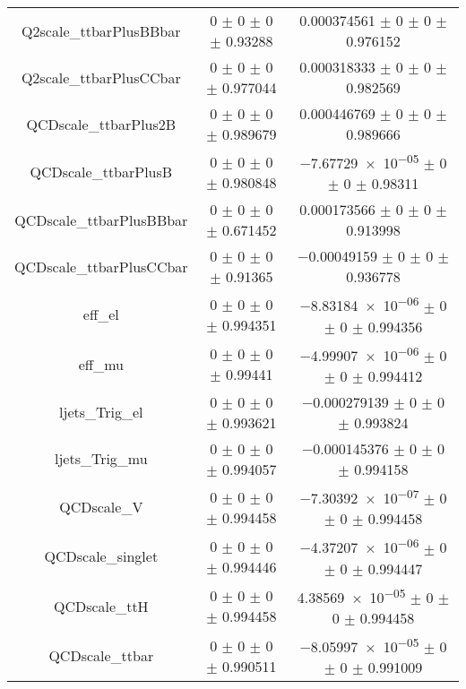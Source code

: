 \begin{table}
\begin{tabular}{ccc}
Q2scale\_ttbarPlusBBbar & \num{0} $\pm$ \num{0} $\pm$ \num{0} $\pm$ \num{0.93288} & \num{0.000374561} $\pm$ \num{0} $\pm$ \num{0} $\pm$ \num{0.976152}\\
Q2scale\_ttbarPlusCCbar & \num{0} $\pm$ \num{0} $\pm$ \num{0} $\pm$ \num{0.977044} & \num{0.000318333} $\pm$ \num{0} $\pm$ \num{0} $\pm$ \num{0.982569}\\
QCDscale\_ttbarPlus2B & \num{0} $\pm$ \num{0} $\pm$ \num{0} $\pm$ \num{0.989679} & \num{0.000446769} $\pm$ \num{0} $\pm$ \num{0} $\pm$ \num{0.989666}\\
QCDscale\_ttbarPlusB & \num{0} $\pm$ \num{0} $\pm$ \num{0} $\pm$ \num{0.980848} & \num{-7.67729e-05} $\pm$ \num{0} $\pm$ \num{0} $\pm$ \num{0.98311}\\
QCDscale\_ttbarPlusBBbar & \num{0} $\pm$ \num{0} $\pm$ \num{0} $\pm$ \num{0.671452} & \num{0.000173566} $\pm$ \num{0} $\pm$ \num{0} $\pm$ \num{0.913998}\\
QCDscale\_ttbarPlusCCbar & \num{0} $\pm$ \num{0} $\pm$ \num{0} $\pm$ \num{0.91365} & \num{-0.00049159} $\pm$ \num{0} $\pm$ \num{0} $\pm$ \num{0.936778}\\
eff\_el & \num{0} $\pm$ \num{0} $\pm$ \num{0} $\pm$ \num{0.994351} & \num{-8.83184e-06} $\pm$ \num{0} $\pm$ \num{0} $\pm$ \num{0.994356}\\
eff\_mu & \num{0} $\pm$ \num{0} $\pm$ \num{0} $\pm$ \num{0.99441} & \num{-4.99907e-06} $\pm$ \num{0} $\pm$ \num{0} $\pm$ \num{0.994412}\\
ljets\_Trig\_el & \num{0} $\pm$ \num{0} $\pm$ \num{0} $\pm$ \num{0.993621} & \num{-0.000279139} $\pm$ \num{0} $\pm$ \num{0} $\pm$ \num{0.993824}\\
ljets\_Trig\_mu & \num{0} $\pm$ \num{0} $\pm$ \num{0} $\pm$ \num{0.994057} & \num{-0.000145376} $\pm$ \num{0} $\pm$ \num{0} $\pm$ \num{0.994158}\\
QCDscale\_V & \num{0} $\pm$ \num{0} $\pm$ \num{0} $\pm$ \num{0.994458} & \num{-7.30392e-07} $\pm$ \num{0} $\pm$ \num{0} $\pm$ \num{0.994458}\\
QCDscale\_singlet & \num{0} $\pm$ \num{0} $\pm$ \num{0} $\pm$ \num{0.994446} & \num{-4.37207e-06} $\pm$ \num{0} $\pm$ \num{0} $\pm$ \num{0.994447}\\
QCDscale\_ttH & \num{0} $\pm$ \num{0} $\pm$ \num{0} $\pm$ \num{0.994458} & \num{4.38569e-05} $\pm$ \num{0} $\pm$ \num{0} $\pm$ \num{0.994458}\\
QCDscale\_ttbar & \num{0} $\pm$ \num{0} $\pm$ \num{0} $\pm$ \num{0.990511} & \num{-8.05997e-05} $\pm$ \num{0} $\pm$ \num{0} $\pm$ \num{0.991009}\\

\end{tabular}
\end{table}
